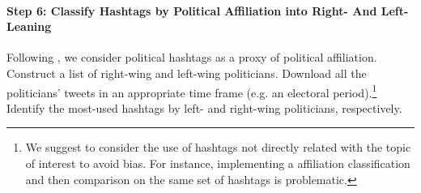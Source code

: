         \paragraph{Step 6: Classify Hashtags by Political Affiliation into Right- And Left-Leaning}
        
        \newline\indent

        Following \cite{rao2010classifying}, we consider political hashtags as a proxy of political affiliation. Construct a list of right-wing and left-wing politicians. Download all the politicians' tweets in an appropriate time frame (e.g. an electoral period).\footnote{We suggest to consider the use of hashtags not directly related with the topic of interest to avoid bias. For instance, implementing a affiliation classification and then comparison on the same set of hashtags is problematic.} Identify the most-used hashtags by left- and right-wing politicians, respectively.
        
        

        
        
        
        
